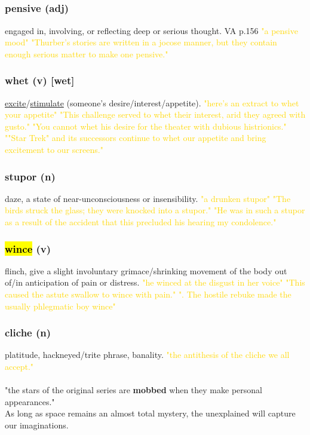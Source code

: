 \documentclass{proc}
\begin{document}
	\newpage
	\subsection{}
	\subsubsection{\textcolor{brickred}{pensive} (adj)}
	engaged in, involving, or reflecting deep or serious thought. VA p.156
	\textcolor{gold}{"a pensive mood" "Thurber's stories are written in a jocose manner, but they 
		contain enough serious matter to make one pensive."}
	
	\subsubsection{\textcolor{brickred}{whet} (v) [wet]}
	\underline{excite}/\underline{stimulate} (someone's desire/interest/appetite).
	\textcolor{gold}{"here's an extract to whet your appetite" "This challenge served to whet their interest, arid they agreed 
		with gusto." "You cannot whet his desire for the theater with dubious histrionics." ""Star Trek" and its 
		successors continue to whet our appetite and bring excitement to our 
		screens."}
	
	\subsubsection{\textcolor{brickred}{stupor} (n)}
	daze, a state of near-unconsciousness or insensibility.
	\textcolor{gold}{"a drunken stupor" "The birds struck the glass; they were knocked into a stupor." "He was in such a stupor as a result of the accident that this precluded his 
		hearing my condolence."}
	
	\subsubsection{\textcolor{brickred}{\hl{wince}} (v)}
	flinch, give a slight involuntary grimace/shrinking movement of the body out of/in anticipation of pain or distress.
	\textcolor{gold}{"he winced at the disgust in her voice" "This caused the astute swallow to wince with pain." ". The hostile rebuke made the usually phlegmatic boy wince"}
	
	\subsubsection{\textcolor{brickred}{cliche} (n)}
	platitude,
	hackneyed/trite phrase,
	banality.
	\textcolor{gold}{ "the antithesis of the cliche we all accept."}\\\\
	"the stars of the original series are 
	\textbf{mobbed} when they make personal appearances."\\
	As long as space remains an almost total mystery, the unexplained 
	will capture our imaginations. 
	
\end{document}
